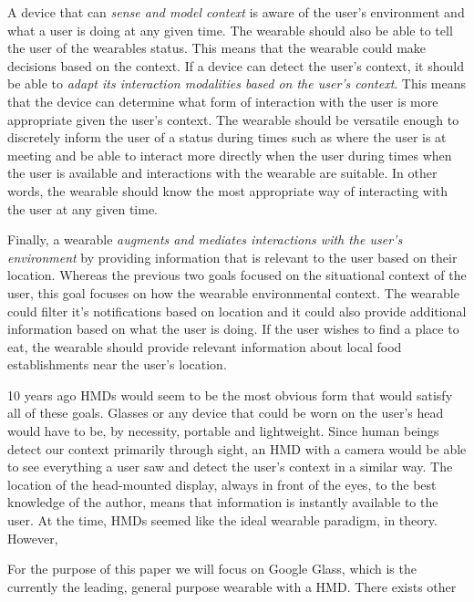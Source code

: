 \documentclass[11pt]{article}
\begin{document}
A device that can \textit{sense and model context} is aware of the user's environment and what a user is doing at any given time. The wearable should also be able to tell the user of the wearables status. This means that the wearable could make decisions based on the context. If a device can detect the user's context, it should be able to \textit{adapt its interaction modalities based on the user's context}. This means that the device can determine what form of interaction with the user is more appropriate given the user's context. The wearable should be versatile enough to discretely inform the user of a status during times such as where the user is at meeting and be able to interact more directly when the user during times when the user is available and interactions with the wearable are suitable. In other words, the wearable should know the most appropriate way of interacting with the user at any given time.

Finally, a wearable \textit{augments and mediates interactions with the user's environment} by providing information that is relevant to the user based on their location. Whereas the previous two goals focused on the situational context of the user, this goal focuses on how the wearable environmental context. The wearable could filter it's notifications based on location and it could also provide additional information based on what the user is doing. If the user wishes to find a place to eat, the wearable should provide relevant information about local food establishments near the user's location. 

10 years ago HMDs would seem to be the most obvious form that would satisfy all of these goals. Glasses or any device that could be worn on the user's head would have to be, by necessity, portable and lightweight. Since human beings detect our context primarily through sight, an HMD with a camera would be able to see everything a user saw and detect the user's context in a similar way. The location of the head-mounted display, always in front of the eyes, to the best knowledge of the author, means that information is instantly available to the user. At the time, HMDs seemed like the ideal wearable paradigm, in theory. However, 

 

 





For the purpose of this paper we will focus on Google Glass, which is the currently the leading, general purpose wearable with a HMD. There exists other 
\end{document}
